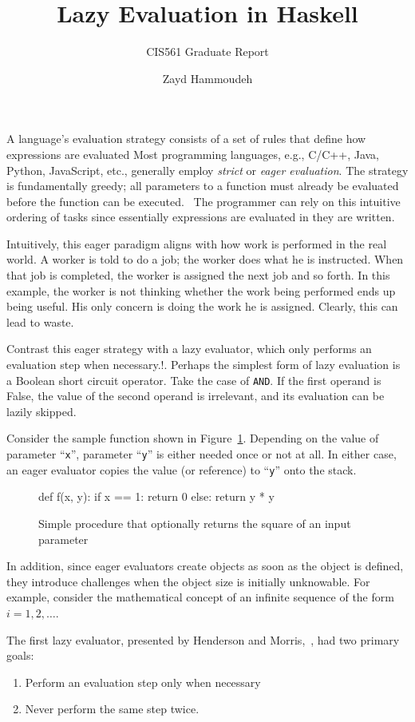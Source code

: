 \documentclass[11pt]{report}
\title{Lazy Evaluation in Haskell}
\subtitle{CIS561 Graduate Report}
\author{Zayd Hammoudeh}
\begin{document}
    A language's evaluation strategy consists of a set of rules that define how expressions are evaluated  Most programming languages, e.g., C/C++, Java, Python, JavaScript, etc., generally employ \emph{strict} or \emph{eager evaluation}.  The strategy is fundamentally greedy; all parameters to a function must already be evaluated before the function can be executed.~\cite{hoover:Notes}  The programmer can rely on this intuitive ordering of tasks since essentially expressions are evaluated in they are written.

    Intuitively, this eager paradigm aligns with how work is performed in the real world.  A worker is told to do a job; the worker does what he is instructed. When that job is completed, the worker is assigned the next job and so forth. In this example, the worker is not thinking whether the work being performed ends up being useful.  His only concern is doing the work he is assigned.  Clearly, this can lead to waste.

    Contrast this eager strategy with a lazy evaluator, which only performs an evaluation step when necessary.!\cite{Henderson:1976}. Perhaps the simplest form of lazy evaluation is a Boolean short circuit operator.  Take the case of {\tt AND}.  If the first operand is False, the value of the second operand is irrelevant, and its evaluation can be lazily skipped.

    Consider the sample function shown in Figure~\ref{lst:Square}.  Depending on the value of parameter ``{\tt x}'', parameter ``{\tt y}'' is either needed once or not at all.  In either case, an eager evaluator copies the value (or reference) to ``{\tt y}'' onto the stack.

    \begin{figure}
        \begin{listings}[python]
            def f(x, y):
            if x == 1:
            return 0
            else:
            return y * y
        \end{listings}
        \caption{Simple procedure that optionally returns the square of an input parameter}\label{lst:Square}
    \end{figure}

    In addition, since eager evaluators create objects as soon as the object is defined, they introduce challenges when the object size is initially unknowable.  For example, consider the mathematical concept of an infinite sequence of the form $i = 1, 2,\ldots$.

    The first lazy evaluator, presented by Henderson and Morris,~\cite{Henderson:1976}, had two primary goals:
    \begin{enumerate}
        \item Perform an evaluation step only when necessary
        \item Never perform the same step twice.
    \end{enumerate}
\noindent
\end{document}
